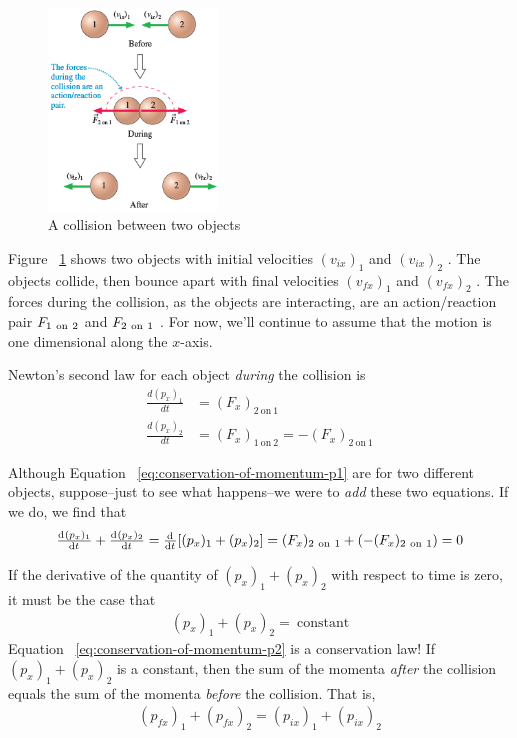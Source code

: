\begin{figure}
    \centering
    \includegraphics[width=0.4\textwidth]{../figures/two-object-collision}
    \caption{A collision between two objects}%
    \label{fig:two-object-collision}
\end{figure}

Figure~%
\ref{fig:two-object-collision} shows two objects with initial velocities
$
    (v_{ix})_1
$ and
$
    (v_{ix})_2
$%
.  The objects collide, then bounce apart with final velocities
$
    (v_{fx})_1
$ and
$
    (v_{fx})_2
$%
.  The forces during the collision, as the objects are interacting, are
an action/reaction pair
$
    F_{\mathrm{1~on~2}}
$ and
$
    F_{\mathrm{2~on~1}}
$%
.  For now, we'll continue to assume that the motion is one dimensional
along the
$
    x
$-axis.

Newton's second law for each object \emph{during} the collision is
\begin{align}
    \label{eq:conservation-of-momentum-p1} \frac{d(p_x)_1}{dt}&=(F_x)_{\mathrm
    {2~on~1}} \\
    \frac{d(p_x)_2}{dt}&=(F_x)_{\mathrm{1~on~2}}=-(F_x)_{\mathrm {2~on~1}}
\end{align}

Although Equation~%
\ref{eq:conservation-of-momentum-p1} are for two different objects,
suppose--just to see what happens--we were to \emph{add} these two
equations.  If we do, we find that
\begin{equation}
    \od{(p_x)_1}{t} + \od{(p_x)_2}{t} = \od{}{t}[(p_x)_1 + (p_x)_2]= (F_x)_
    {\mathrm{2~on~1}} + (-(F_x)_{\mathrm{2~on~1}}) = 0
\end{equation}

If the derivative of the quantity of
$
    (p_x)_1 + (p_x)_2
$ with respect to time is zero, it must be the case that
\begin{align}
    \label{eq:conservation-of-momentum-p2} (p_x)_1 + (p_x)_2 = \mathrm{~constant}
\end{align}
Equation~%
\ref{eq:conservation-of-momentum-p2} is a conservation law!  If
$
    (p_x)_1 + (p_x)_2
$ is a constant, then the sum of the momenta \emph{after} the collision
equals the sum of the momenta \emph{before} the collision.  That is,
\begin{align}
    \label{eq:conservation-of-momentum-p3} (p_{fx})_1 + (p_{fx})_2 = (p_
    {ix})_1 + (p_{ix})_2
\end{align}

